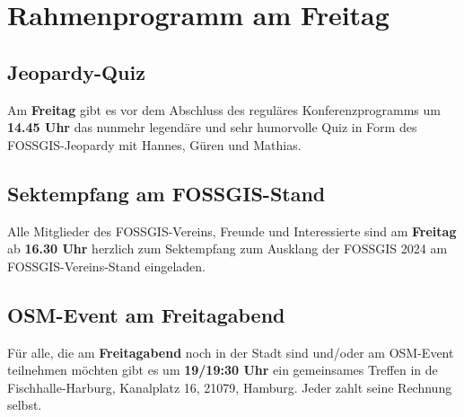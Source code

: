 \section*{Rahmenprogramm am Freitag}
\subsection*{Jeopardy-Quiz}
Am {\bfseries Freitag} gibt es vor dem Abschluss des reguläres Konferenzprogramms um {\bfseries 14.45 Uhr} das nunmehr legendäre und sehr humorvolle Quiz in Form des FOSSGIS-Jeopardy mit Hannes, Güren und Mathias.

\subsection*{Sektempfang am FOSSGIS-Stand}
Alle Mitglieder des FOSSGIS-Vereins, Freunde und Interessierte sind am {\bfseries Freitag} ab {\bfseries 16.30 Uhr} herzlich zum Sektempfang zum Ausklang der FOSSGIS 2024 am FOSSGIS-Vereins-Stand eingeladen.

\subsection*{OSM-Event am Freitagabend}
Für alle, die am {\bfseries Freitagabend} noch in der Stadt sind und/oder am OSM-Event teilnehmen möchten gibt es um {\bfseries 19/19:30 Uhr} ein gemeinsames Treffen in de Fischhalle-Harburg, Kanalplatz 16, 21079, Hamburg. Jeder zahlt seine Rechnung selbst.

\small
\newpage
\label{platinsposoren}

\newpage

\newpage

\newpage

\newpage

\normalsize

